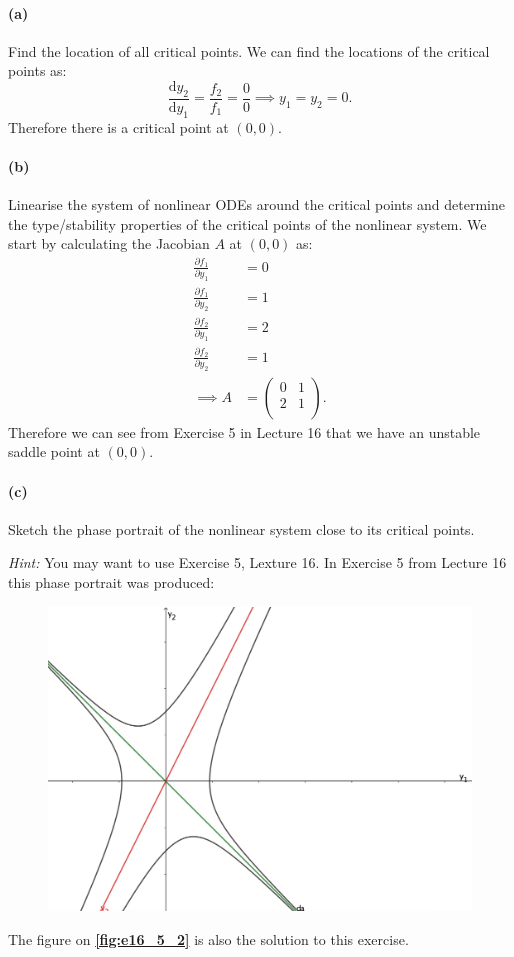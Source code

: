 \paragraph{(a)} Find the location of all critical points.
\bigbreak
We can find the locations of the critical points as:
\[ 
\frac{\mathrm{d}y_2}{\mathrm{d}y_1} = \frac{f_2}{f_1} = \frac{0}{0} \implies y_1 = y_2 = 0
.\]
Therefore there is a critical point at $\left( 0,0 \right) $.


\paragraph{(b)} Linearise the system of nonlinear ODEs around the critical points and determine the type/stability properties of the critical points of the nonlinear system.
\bigbreak
We start by calculating the Jacobian $A$ at $(0,0)$ as:
\begin{align*}
  \frac{\partial f_1}{\partial y_1} &= 0 \\
  \frac{\partial f_1}{\partial y_2} &= 1 \\
  \frac{\partial f_2}{\partial y_1} &= 2 \\
  \frac{\partial f_2}{\partial y_2} &= 1 \\
  \implies A &= \begin{pmatrix}
  0 & 1\\
  2 & 1\\
  \end{pmatrix}
.\end{align*}
Therefore we can see from Exercise 5 in Lecture 16 that we have an unstable saddle point at $(0,0)$.


\paragraph{(c)} Sketch the phase portrait of the nonlinear system close to its critical points.

\textit{Hint:} You may want to use Exercise 5, Lexture 16.
\bigbreak
In Exercise 5 from Lecture 16 this phase portrait was produced:
\begin{figure} [ht]
  \centering
  \includegraphics[width=0.5\linewidth]{./figures/e16_5.png}
  \caption{}
  \label{fig:e16_5_2}
\end{figure}
The figure on \textbf{\autoref{fig:e16_5_2}} is also the solution to this exercise.
